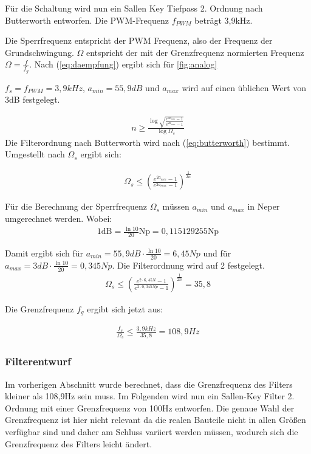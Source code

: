 Für die Schaltung wird nun ein Sallen Key Tiefpass 2. Ordnung nach Butterworth entworfen. Die PWM-Frequenz $f_{PWM}$ beträgt 3,9kHz.

Die Sperrfrequenz entspricht der PWM Frequenz, also der Frequenz der Grundschwingung. $\Omega$ entspricht der mit der Grenzfrequenz 
normierten Frequenz $\Omega=\frac{f}{f_g}$. Nach (\ref{eq:daempfung}) ergibt sich für \cref{fig:analog}

$f_s=f_{PWM}=3,9 kHz$, $a_{min}=55,9 dB$ und $a_{max}$ wird auf einen üblichen Wert von 3dB festgelegt.







\begin{align}
n \ge \frac{\log{\sqrt{\frac{e^{2a_{min}}-1}{e^{2a_{max}}-1}}}}{\log{\Omega_s}}
\label{eq:butterworth}
\end{align}
Die Filterordnung nach Butterworth wird nach (\ref{eq:butterworth}) bestimmt\cite{AnalogFilter}. Umgestellt nach $\Omega_s$ ergibt sich:

\begin{align}
\Omega_s \le  \left(\frac{e^{2a_{min}}-1}{e^{2a_{max}}-1}\right)^{\frac{1}{2n}}
\end{align}



Für die Berechnung der Sperrfrequenz $\Omega_s$ müssen  $a_{min}$ und $a_{max}$ in Neper umgerechnet werden. Wobei:
\begin{align*}
1 \text{dB} =  \frac{\ln{10}}{20}\text{Np} = 0,115129255 \text{Np}   
\end{align*}

Damit ergibt sich für $a_{min}=55,9 dB\cdot \frac{\ln{10}}{20}=6,45Np$ und für  $a_{max}=3 dB\cdot \frac{\ln{10}}{20}=0,345Np$. Die Filterordnung wird auf 2 festgelegt.
\begin{align}
\Omega_s \le  \left(\frac{e^{2\cdot6,45N }-1}{e^{2\cdot 0,345Np}-1}\right)^{\frac{1}{2n}}  = 35,8
\end{align}

Die Grenzfrequenz $f_g$ ergibt sich jetzt aus:

\begin{align}
\frac{f_s}{\Omega_s} \le \frac{3,9kHz}{35,8} = 108,9Hz
\end{align}

\subsubsection{Filterentwurf}
Im vorherigen Abschnitt wurde berechnet, dass die Grenzfrequenz des Filters kleiner als 108,9Hz sein muss.
Im Folgenden wird nun ein Sallen-Key Filter 2. Ordnung mit einer Grenzfrequenz von 100Hz entworfen.
Die genaue Wahl der Grenzfrequenz ist hier nicht relevant da die realen Bauteile nicht in  allen Größen 
verfügbar sind und daher am Schluss variiert werden müssen, wodurch sich die Grenzfrequenz des Filters leicht ändert.


